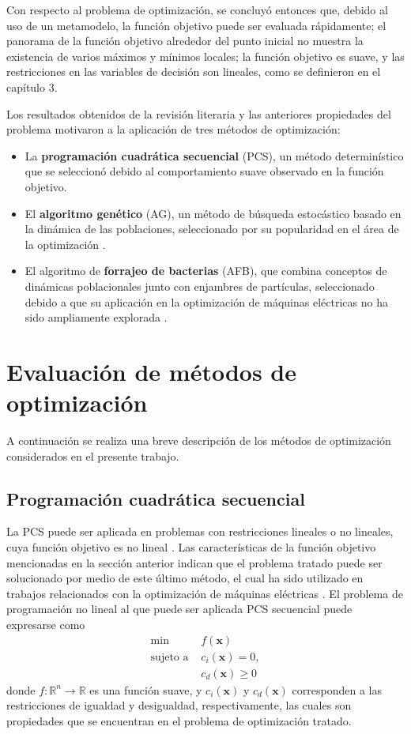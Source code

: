 Con respecto al problema de optimización, se concluyó entonces que, debido al uso de un metamodelo, la función objetivo puede ser evaluada rápidamente; el panorama de la función objetivo alrededor del punto inicial no muestra la existencia de varios máximos y mínimos locales; la función objetivo es suave, y las restricciones en las variables de decisión son lineales, como se definieron en el capítulo 3.

Los resultados obtenidos de la revisión literaria y las anteriores propiedades del problema motivaron a la aplicación de tres métodos de optimización: 
\begin{itemize}
\item La \textbf{programación cuadrática secuencial} (PCS), un método determinístico que se seleccionó debido al comportamiento suave observado en la función objetivo.
\item El \textbf{algoritmo genético} (AG), un método de búsqueda estocástico basado en la dinámica de las poblaciones, seleccionado por su popularidad en el área de la optimización \cite{tenne2010}.
\item El algoritmo de \textbf{forrajeo de bacterias} (AFB), que combina conceptos de dinámicas poblacionales junto con enjambres de partículas, seleccionado debido a que su aplicación en la optimización de máquinas eléctricas no ha sido ampliamente explorada \cite{duan2013}.
\end{itemize}

\section{Evaluación de métodos de optimización}
A continuación se realiza una breve descripción de los métodos de optimización considerados en el presente trabajo.

\subsection{Programación cuadrática secuencial}
La PCS puede ser aplicada en problemas con restricciones lineales o no lineales, cuya función objetivo es no lineal \cite{nocedal1999}. Las características de la función objetivo mencionadas en la sección anterior indican que el problema tratado puede ser solucionado por medio de este último método, el cual ha sido utilizado en trabajos relacionados con la optimización de máquinas eléctricas \cite{raminosoa2006,astrid2014,barhoumi2016}. El problema de programación no lineal al que puede ser aplicada PCS secuencial puede expresarse como
\begin{align*}
\text{min } &f(\mathbf{x})\\
\text{sujeto a } &c_i(\mathbf{x}) = 0,\\
&c_d(\mathbf{x}) \geq 0
\end{align*}
donde $f:\mathbb{R}^n\rightarrow\mathbb{R}$ es una función suave, y $c_i(\mathbf{x})$ y $c_d(\mathbf{x})$ corresponden a las restricciones de igualdad y desigualdad, respectivamente, las cuales son propiedades que se encuentran en el problema de optimización tratado. 

